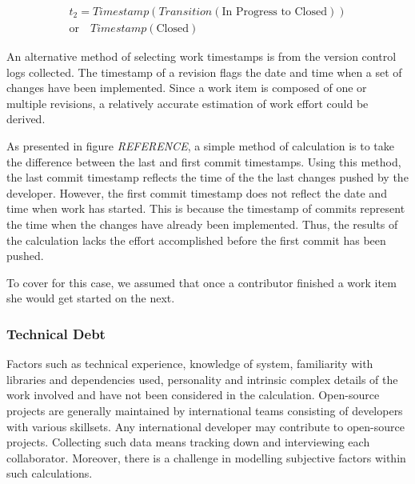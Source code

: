\documentclass{mpaper}
\begin{document}
\begin{equation}
  \label{eq-ticket-closed}
  \begin{aligned}
    t_{2} = Timestamp(Transition(\textrm{In Progress to Closed})) \\ 
      \textrm{or} \quad Timestamp(\textrm{Closed})    
  \end{aligned}
\end{equation}

An alternative method of selecting work timestamps is from the version control
logs collected. The timestamp of a revision flags the date and time when a set
of changes have been implemented. Since a work item is composed of one or
multiple revisions, a relatively accurate estimation of work effort could be
derived.

As presented in figure \emph{REFERENCE}, a simple method of calculation is to
take the difference between the last and first commit timestamps. Using this
method, the last commit timestamp reflects the time of the the last changes
pushed by the developer. However, the first commit timestamp does not reflect
the date and time when work has started. This is because the timestamp of
commits represent the time when the changes have already been implemented. Thus,
the results of the calculation lacks the effort accomplished before the first
commit has been pushed.

To cover for this case, we assumed that once a contributor finished a work item
she would get started on the next. 


\subsubsection*{Technical Debt}



Factors such as technical experience, knowledge of system, familiarity with
libraries and dependencies used, personality and intrinsic complex details of
the work involved and have not been considered in the calculation. Open-source
projects are generally maintained by international teams consisting of
developers with various skillsets. Any international developer may contribute to
open-source projects. Collecting such data means tracking down and interviewing
each collaborator. Moreover, there is a challenge in modelling subjective
factors within such calculations.
\end{document}
